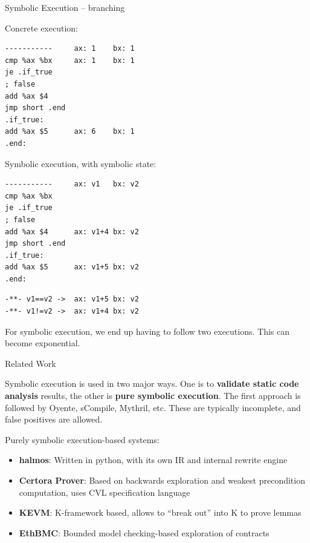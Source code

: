 \documentclass[aspectratio=169]{beamer}
\begin{document}
\begin{frame}[fragile=singleslide]{Symbolic Execution -- branching}
\begin{minipage}[t]{0.45\textwidth}
Concrete execution:
\begin{Verbatim}[fontsize=\small]
-----------     ax: 1    bx: 1
cmp %ax %bx     ax: 1    bx: 1
je .if_true
; false
add %ax $4
jmp short .end
.if_true:
add %ax $5      ax: 6    bx: 1
.end:
\end{Verbatim}
\end{minipage}%
\begin{minipage}[t]{0.45\textwidth}
Symbolic execution, with symbolic state:
\begin{Verbatim}[fontsize=\small]
-----------     ax: v1   bx: v2
cmp %ax %bx
je .if_true
; false
add %ax $4      ax: v1+4 bx: v2
jmp short .end
.if_true:
add %ax $5      ax: v1+5 bx: v2
.end:
\end{Verbatim}
\begin{Verbatim}[fontsize=\small]
-**- v1==v2 ->  ax: v1+5 bx: v2
-**- v1!=v2 ->  ax: v1+4 bx: v2
\end{Verbatim}
\end{minipage}
\bigskip

For symbolic execution, we end up having to follow two executions. This can become exponential.
\end{frame}


\begin{frame}{Related Work}

Symbolic execution is used in two major ways. One is to \textbf{validate static
code analysis} results, the other is \textbf{pure symbolic execution}. The
first approach is followed by Oyente, sCompile, Mythril, etc. These are
typically incomplete, and false positives are allowed.

\bigskip

Purely symbolic execution-based systems:
\begin{itemize}
\item \textbf{halmos}: Written in python, with its own IR and internal rewrite
    engine
\item \textbf{Certora Prover}: Based on backwards exploration and weakest
    precondition computation, uses CVL specification language
\item \textbf{KEVM}: K-framework based, allows to ``break out'' into K to prove lemmas
\item \textbf{EthBMC}: Bounded model checking-based exploration of contracts
\end{itemize}
\end{frame}
\end{document}

